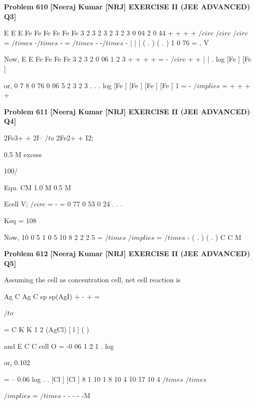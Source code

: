 \begin{problembox}
\textbf{Problem 610} \hfill \textbf{[Neeraj Kumar [NRJ] EXERCISE II (JEE ADVANCED) Q3]}
\label{q:ext-nrj_all_questions-610}

E
E
E
Fe
Fe
Fe
Fe
Fe
Fe
3
2
3
2
3
2
3
2
3
0 04
2
0 44
+
+
+
+
$/circ$
$/circ$
$/circ$
=
$/times$
-$/times$
-
=
$/times$ -
-$/times$ -
|
|
|
(
.
)
(
.
)
1
0 76
= .
V
 
 
 Now, E
E
Fe
Fe
Fe
Fe
3
2
3
2
0 06
1
2
3
+
+
+
+
=
-
$/circ$
+
+
|
|
.
log [Fe
]
[Fe
]
 
 
 or, 0 7 8
0 76
0 06
5
2
3
2
3
.
.
.
log [Fe
]
[Fe
]
[Fe
]
[Fe
]
1 =
-
$/implies$
=
+
+
+
+
\end{problembox}

\begin{problembox}
\textbf{Problem 611} \hfill \textbf{[Neeraj Kumar [NRJ] EXERCISE II (JEE ADVANCED) Q4]}
\label{q:ext-nrj_all_questions-611}

2Fe3+    +    2I--   $/to$   2Fe2+   +    I2;  
 
                  0.5 M         excess
 
 100/%
 
 Equ.           CM         1.0 M         0.5 M
 
 
Ecell
V;
$/circ$
=
-
=
0 77
0 53
0 24
.
.
.
 
 
 Keq = 108
 
 Now,  10
0 5
1 0
5 10
8
2
2
2
5
=
$/times$
$/implies$
=
$/times$
-
( . )
( . )
C
C
M
\end{problembox}

\begin{problembox}
\textbf{Problem 612} \hfill \textbf{[Neeraj Kumar [NRJ] EXERCISE II (JEE ADVANCED) Q5]}
\label{q:ext-nrj_all_questions-612}

Assuming the cell as concentration cell, net cell 
reaction is
 
 
Ag
C
Ag
C
sp
sp(AgI)
+
-
+
=
 
  
 
   $/to$
 
=
C
K
K
1
2
(AgCl)
[
l ]
(
) 
 
 and E
C
C
cell
O
=
-0 06
1
2
1
.
log
 
 
 or, 0.102 
 
 = -- 0.06   log
.
.
[Cl ]
[Cl ]
8 1 10
1 8 10
4
10
17
10
4
$/times$
$/times$
 
  
 
  
$/implies$
=
$/times$
-
-
-
-
-M
\end{problembox}

